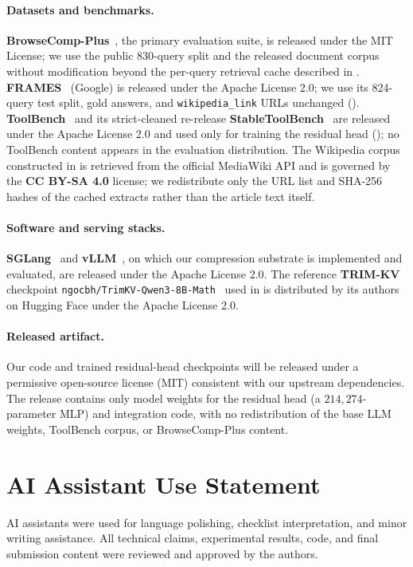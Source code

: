 \documentclass[11pt]{article}
\begin{document}
\paragraph{Datasets and benchmarks.}
\textbf{BrowseComp-Plus}~\citep{chen2025browsecomp}, the primary
evaluation suite, is released under the MIT License; we use the
public 830-query split and the released document corpus without
modification beyond the per-query retrieval cache described in
.
\textbf{FRAMES}~\citep{krishna2024fact} (Google) is released under
the Apache License 2.0; we use its 824-query test split, gold
answers, and \texttt{wikipedia\_link} URLs unchanged
().
\textbf{ToolBench}~\citep{qin2024toolllm} and its strict-cleaned
re-release \textbf{StableToolBench}~\citep{guo2024stabletoolbench}
are released under the Apache License 2.0 and used only for
training the residual head (); no ToolBench
content appears in the evaluation distribution.
The Wikipedia corpus constructed in 
is retrieved from the official MediaWiki API and is governed by the
\textbf{CC BY-SA 4.0} license; we redistribute only the URL list
and SHA-256 hashes of the cached extracts rather than the article
text itself.

\paragraph{Software and serving stacks.}
\textbf{SGLang}~\citep{zheng2024sglang} and
\textbf{vLLM}~\citep{kwon2023efficient}, on which our compression
substrate is implemented and evaluated, are released under the
Apache License 2.0. The reference \textbf{TRIM-KV} checkpoint
\texttt{ngocbh/TrimKV-Qwen3-8B-Math}~\citep{bui2025cache} used in
 is distributed by its authors on
Hugging Face under the Apache License 2.0.

\paragraph{Released artifact.}
Our code and trained residual-head checkpoints will be released
under a permissive open-source license (MIT) consistent with our
upstream dependencies. The release contains only model weights for
the residual head (a $214{,}274$-parameter MLP) and integration
code, with no redistribution of the base LLM weights, ToolBench
corpus, or BrowseComp-Plus content.

\section{AI Assistant Use Statement}
\label{appendix:ai-assistant-use}
AI assistants were used for language polishing, checklist
interpretation, and minor writing assistance. All technical claims,
experimental results, code, and final submission content were
reviewed and approved by the authors.
\end{document}
